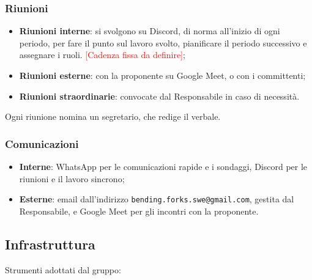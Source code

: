 \documentclass[12pt,a4paper]{article}
\newcommand{\ph}[1]{\textcolor{red}{[#1]}}
\newcommand{\tightlist}{\setlength{\itemsep}{1pt}\setlength{\parskip}{0pt}}
\begin{document}
\subsubsection{Riunioni}
\begin{itemize}
\tightlist
\item \textbf{Riunioni interne}: si svolgono su Discord, di norma all'inizio di ogni periodo, per fare il punto sul lavoro svolto, pianificare il periodo successivo e assegnare i ruoli. \ph{Cadenza fissa da definire};
\item \textbf{Riunioni esterne}: con la proponente su Google Meet, o con i committenti;
\item \textbf{Riunioni straordinarie}: convocate dal Responsabile in caso di necessità.
\end{itemize}
Ogni riunione nomina un segretario, che redige il verbale.

\subsubsection{Comunicazioni}
\begin{itemize}
\tightlist
\item \textbf{Interne}: WhatsApp per le comunicazioni rapide e i sondaggi, Discord per le riunioni e il lavoro sincrono;
\item \textbf{Esterne}: email dall'indirizzo \texttt{bending.forks.swe@gmail.com}, gestita dal Responsabile, e Google Meet per gli incontri con la proponente.
\end{itemize}

\subsection{Infrastruttura}
Strumenti adottati dal gruppo:
\end{document}
